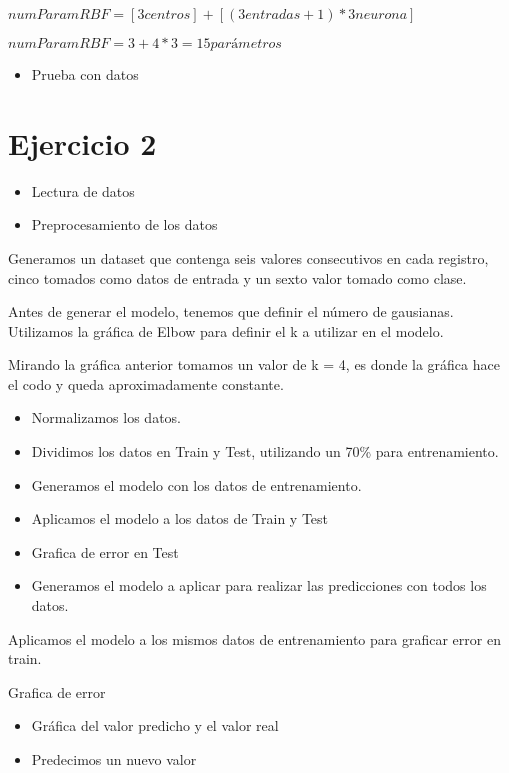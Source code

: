 \documentclass[]{book}
\providecommand{\tightlist}{%
  \setlength{\itemsep}{0pt}\setlength{\parskip}{0pt}}
\begin{document}
\(numParamRBF = [3 centros] + [(3 entradas + 1) * 3 neurona]\)

\(numParamRBF = 3 + 4 * 3 = 15 parámetros\)

\begin{itemize}
\tightlist
\item
  Prueba con datos
\end{itemize}

\hypertarget{ejercicio-2-1}{%
\section{Ejercicio 2}\label{ejercicio-2-1}}

\begin{itemize}
\item
  Lectura de datos
\item
  Preprocesamiento de los datos
\end{itemize}

Generamos un dataset que contenga seis valores consecutivos en cada registro, cinco tomados como datos de entrada y un sexto valor tomado como clase.

Antes de generar el modelo, tenemos que definir el número de gausianas. Utilizamos la gráfica de Elbow para definir el k a utilizar en el modelo.

Mirando la gráfica anterior tomamos un valor de k = 4, es donde la gráfica hace el codo y queda aproximadamente constante.

\begin{itemize}
\item
  Normalizamos los datos.
\item
  Dividimos los datos en Train y Test, utilizando un 70\% para entrenamiento.
\item
  Generamos el modelo con los datos de entrenamiento.
\item
  Aplicamos el modelo a los datos de Train y Test
\item
  Grafica de error en Test
\item
  Generamos el modelo a aplicar para realizar las predicciones con todos los datos.
\end{itemize}

Aplicamos el modelo a los mismos datos de entrenamiento para graficar error en train.

Grafica de error

\begin{itemize}
\item
  Gráfica del valor predicho y el valor real
\item
  Predecimos un nuevo valor
\end{itemize}
\end{document}
